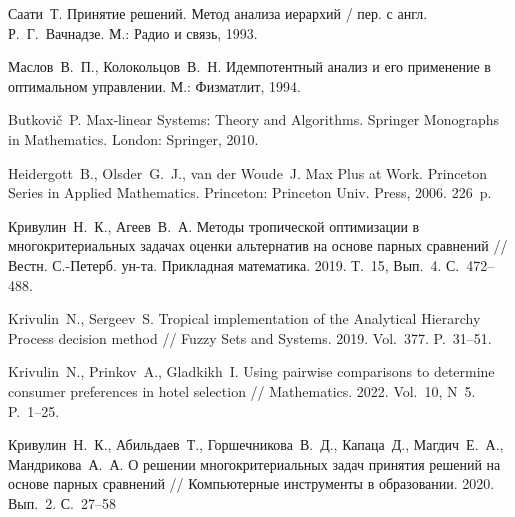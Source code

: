 \documentclass{spisok-article}
\begin{document}




\begin{thebibliography}{8}

Саати~Т. Принятие решений. Метод анализа иерархий / пер. с англ. Р.~Г.~Вачнадзе. М.: Радио и связь, 1993.

Маслов~В.~П., Колокольцов~В.~Н.
Идемпотентный анализ и его применение в оптимальном управлении. М.: Физматлит, 1994.

Butkovi\v{c}~P. Max-linear Systems: Theory and Algorithms.
Springer Monographs in Mathematics. London: Springer, 2010.


Heidergott~B., Olsder~G.~J., van der Woude~J.
Max Plus at Work. Princeton Series in Applied Mathematics.
Princeton: Princeton Univ. Press, 2006. 226~p.

 Кривулин~Н.~К., Агеев~В.~А. Методы тропической оптимизации в многокритериальных задачах оценки альтернатив на основе парных сравнений //
Вестн. С.-Петерб. ун-та. Прикладная математика. 2019. Т.~15, Вып.~4. С.~472--488.

 Krivulin~N., Sergeev~S. Tropical implementation of the {A}nalytical {H}ierarchy {P}rocess decision method //
Fuzzy Sets and Systems. 2019. Vol.~377. P.~31--51.


 Krivulin~N., Prinkov~A., Gladkikh~I. Using pairwise comparisons to determine consumer preferences in hotel selection //
Mathematics. 2022. Vol.~10, N~5. P.~1--25.

 Кривулин~Н.~К., Абильдаев~Т., Горшечникова~В.~Д., Капаца~Д., Магдич~Е.~А., Мандрикова~А.~А. О решении многокритериальных задач принятия решений на основе парных сравнений //
Компьютерные инструменты в образовании. 2020. Вып.~2. С.~27--58





\end{thebibliography}
\end{document}
